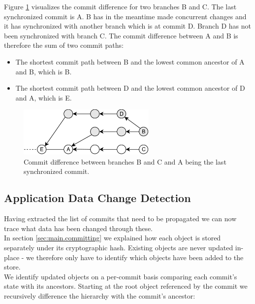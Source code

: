 Figure \ref{fig:histo.new-commits} visualizes the commit difference for two branches B and C.
The last synchronized commit is A.
B has in the meantime made concurrent changes and it has synchronized with another branch which is at commit D.
Branch D has not been synchronized with branch C.
The commit difference between A and B is therefore the sum of two commit paths:\\

\begin{itemize}
\item The shortest commit path between B and the lowest common ancestor of A and B, which is B.
\item The shortest commit path between D and the lowest common ancestor of D and A, which is E.
\end{itemize}

\begin{figure}[new-commits]
  \centering
  \includegraphics[width=0.6\textwidth]{img/new-commits}
  \caption{Commit difference between branches B and C and A being the last synchronized commit.}
  \label{fig:histo.new-commits}
\end{figure}

\subsection{Application Data Change Detection}

Having extracted the list of commits that need to be propagated we can now trace what data has been changed through these.\\
In section \ref{sec:main.committing} we explained how each object is stored separately under its cryptographic hash.
Existing objects are never updated in-place - we therefore only have to identify which objects have been added to the store.\\

We identify updated objects on a per-commit basis comparing each commit's state with its ancestors.
Starting at the root object referenced by the commit we recursively difference the hierarchy with the commit's ancestor:

